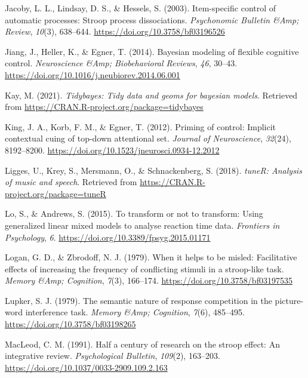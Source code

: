 \documentclass[
  ,man,floatsintext]{apa6}
\newlength{\cslhangindent}
\newlength{\cslentryspacingunit} %
\newenvironment{CSLReferences}[2] %
 {%
  \setlength{\parindent}{0pt}
  \ifodd #1
  \let\oldpar\par
  \def\par{\hangindent=\cslhangindent\oldpar}
  \fi
  \setlength{\parskip}{#2\cslentryspacingunit}
 }%
 {}
\begin{document}
\begin{CSLReferences}{1}{0}
\leavevmode{}%
Jacoby, L. L., Lindsay, D. S., \& Hessels, S. (2003). Item-specific control of automatic processes: Stroop process dissociations. \emph{Psychonomic Bulletin \&Amp; Review}, \emph{10}(3), 638--644. \url{https://doi.org/10.3758/bf03196526}

\leavevmode{}%
Jiang, J., Heller, K., \& Egner, T. (2014). Bayesian modeling of flexible cognitive control. \emph{Neuroscience \&Amp; Biobehavioral Reviews}, \emph{46}, 30--43. \url{https://doi.org/10.1016/j.neubiorev.2014.06.001}

\leavevmode{}%
Kay, M. (2021). \emph{Tidybayes: Tidy data and geoms for bayesian models}. Retrieved from \url{https://CRAN.R-project.org/package=tidybayes}

\leavevmode{}%
King, J. A., Korb, F. M., \& Egner, T. (2012). Priming of control: Implicit contextual cuing of top-down attentional set. \emph{Journal of Neuroscience}, \emph{32}(24), 8192--8200. \url{https://doi.org/10.1523/jneurosci.0934-12.2012}

\leavevmode{}%
Ligges, U., Krey, S., Mersmann, O., \& Schnackenberg, S. (2018). \emph{{tuneR}: Analysis of music and speech}. Retrieved from \url{https://CRAN.R-project.org/package=tuneR}

\leavevmode{}%
Lo, S., \& Andrews, S. (2015). To transform or not to transform: Using generalized linear mixed models to analyse reaction time data. \emph{Frontiers in Psychology}, \emph{6}. \url{https://doi.org/10.3389/fpsyg.2015.01171}

\leavevmode{}%
Logan, G. D., \& Zbrodoff, N. J. (1979). When it helps to be misled: Facilitative effects of increasing the frequency of conflicting stimuli in a stroop-like task. \emph{Memory \&Amp; Cognition}, \emph{7}(3), 166--174. \url{https://doi.org/10.3758/bf03197535}

\leavevmode{}%
Lupker, S. J. (1979). The semantic nature of response competition in the picture-word interference task. \emph{Memory \&Amp; Cognition}, \emph{7}(6), 485--495. \url{https://doi.org/10.3758/bf03198265}

\leavevmode{}%
MacLeod, C. M. (1991). Half a century of research on the stroop effect: An integrative review. \emph{Psychological Bulletin}, \emph{109}(2), 163--203. \url{https://doi.org/10.1037/0033-2909.109.2.163}


\end{CSLReferences}
\end{document}
